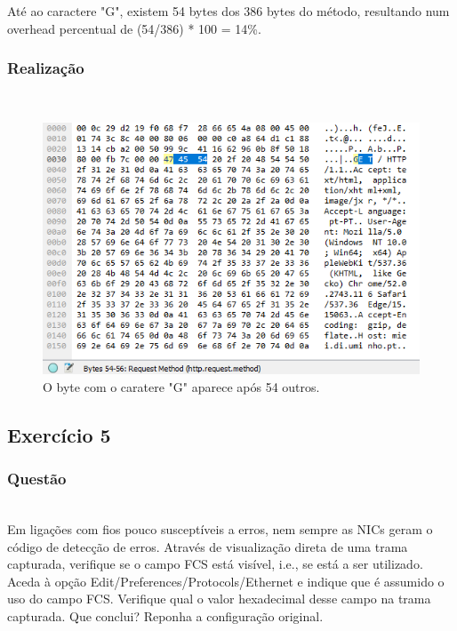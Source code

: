 \documentclass{llncs}
\begin{document}
Até ao caractere "G", existem 54 bytes dos 386 bytes do método, resultando num overhead percentual de (54/386) * 100 = 14\%.

\subsubsection{Realização}\rule[-10pt]{0pt}{10pt}\\

\begin{figure}
  \begin{center}
  \includegraphics[scale=0.8]{imagens/HTTPbytes.png} 
  \end{center}
  \caption{O byte com o caratere "G" aparece após 54 outros.}
  \label{fig:http_bytes}
\end{figure} 

\clearpage
\subsection{Exercício 5}
\subsubsection{Questão}\rule[-10pt]{0pt}{10pt}\\

Em ligações com fios pouco susceptíveis a erros, nem sempre as NICs geram o código de detecção de erros. Através de visualização direta de uma trama capturada, verifique se o campo FCS está visível, i.e., se está a ser utilizado. Aceda à opção Edit/Preferences/Protocols/Ethernet e indique que é assumido o uso do campo FCS. Verifique qual o valor hexadecimal desse campo na trama
capturada. Que conclui? Reponha a configuração original.
\end{document}
